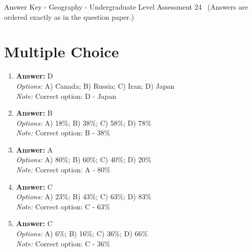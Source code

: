 \documentclass[12pt]{article}
\begin{document}
\begin{center}
Answer Key - Geography - Undergraduate Level Assessment 24 \
\small (Answers are ordered exactly as in the question paper.)
\end{center}

\section*{Multiple Choice}
\begin{enumerate}[label=\arabic*.]
\item \textbf{Answer:} D
\\ \textit{Options:} A) Canada; B) Russia; C) Iran; D) Japan
\\ \textit{Note:} Correct option: D - Japan
\item \textbf{Answer:} B
\\ \textit{Options:} A) 18\%; B) 38\%; C) 58\%; D) 78\%
\\ \textit{Note:} Correct option: B - 38\%
\item \textbf{Answer:} A
\\ \textit{Options:} A) 80\%; B) 60\%; C) 40\%; D) 20\%
\\ \textit{Note:} Correct option: A - 80\%
\item \textbf{Answer:} C
\\ \textit{Options:} A) 23\%; B) 43\%; C) 63\%; D) 83\%
\\ \textit{Note:} Correct option: C - 63\%
\item \textbf{Answer:} C
\\ \textit{Options:} A) 6\%; B) 16\%; C) 36\%; D) 66\%
\\ \textit{Note:} Correct option: C - 36\%
\end{enumerate}
\end{document}
